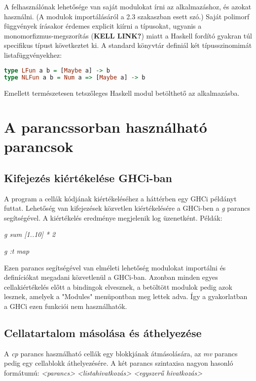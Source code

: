 A felhasználónak lehetősége van saját modulokat írni az alkalmazáshoz, és azokat használni. (A modulok importálásáról a 2.3 szakaszban esett szó.) Saját polimorf függvények írásakor érdemes explicit kiírni a típusokat, ugyanis a monomorfizmus-megszorítás (\textbf{KELL LINK?}) miatt a Haskell fordító gyakran túl specifikus típust következtet ki. A standard könyvtár definiál két típusszinomimát listafüggvényekhez:

\begin{lstlisting}[caption={LFun és NLFun}, language={Haskell},label=src:lfun]
type LFun a b = [Maybe a] -> b
type NLFun a b = Num a => [Maybe a] -> b
\end{lstlisting}

Emellett természetesen tetszőleges Haskell modul betölthető az alkalmazásba.

\section{A parancssorban használható parancsok}

\subsection{Kifejezés kiértékelése GHCi-ban}

A program a cellák kódjának kiértékeléséhez a háttérben egy GHCi példányt futtat. Lehetőség van kifejezések közvetlen kiértékelésére a GHCi-ben a \textit{g} parancs segítségével. A kiértékelés eredménye megjelenik log üzenetként. Példák:
\begin{compactenum}
	\item \textit{g sum [1..10] * 2}
	\item \textit{g :t map}
\end{compactenum}

Ezen parancs segítségével van elméleti lehetőség modulokat importálni és definíciókat megadani közvetlenül a GHCi-ban. Azonban minden egyes cellakiértékelés előtt a bindingok elvesznek, a betöltött modulok pedig azok lesznek, amelyek a "Modules" menüpontban meg lettek adva. Így a gyakorlatban a GHCi ezen funkciói nem használhatók.

\subsection{Cellatartalom másolása és áthelyezése}

A \textit{cp} parancs használható cellák egy blokkjának átmásolására, az \textit{mv} parancs pedig egy cellablokk áthelyezésére. A két parancs szintaxisa nagyon hasonló formátumú: \textit{<parancs> <listahivatkozás> <egyszerű hivatkozás>}

